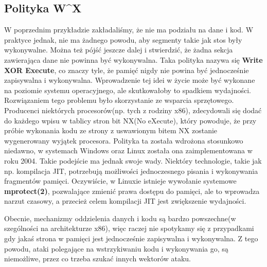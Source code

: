\documentclass[polish]{kbk}
\begin{document}
\subsection{Polityka W\string^X}
W poprzednim przykładzie zakładaliśmy, że nie ma podziału na dane i kod. 
W praktyce jednak, nie ma żadnego powodu, aby segmenty takie jak stos
były wykonywalne. Można też pójść jeszcze dalej i stwierdzić, że żadna 
sekcja zawierająca dane nie powinna być wykonywalna. Taka polityka 
nazywa się \textbf{Write XOR Execute}, co znaczy tyle, że pamięć nigdy 
nie powina być jednocześnie zapisywalna i wykonywalna. Wprowadzenie tej idei 
w życie może być wykonane na poziomie systemu operacyjnego, ale skutkowałoby 
to spadkiem wydajności\cite{bitnx}. Rozwiązaniem tego problemu było skorzystanie 
ze wsparcia sprzętowego. Producenci niektórych procesorów(np. tych z rodziny x86), 
zdecydowali się dodać do każdego wpisu w tablicy stron bit NX(No eXecute), który 
powoduje, że przy próbie wykonania kodu ze strony z uswawionym bitem NX zostanie 
wygenerowany wyjątek procesora. Polityka ta została wdrożona stosunkowo niedawno, 
w systemach Windows oraz Linux została ona zaimplementowana w roku 2004\cite{bitnx}.
Takie podejście ma jednak swoje wady. Niektóry technologie, takie jak np. 
kompilacja JIT, potrzebują możliwości jednoczesnego pisania i wykonywania 
fragmentów pamięci. Oczywiście, w Linuxie istnieje wywołanie systemowe 
\textbf{mprotect(2)}, pozwalające zmienić prawa dostępu do pamięci, ale to 
wprowadza narzut czasowy, a przecież celem kompilacji JIT jest zwiększenie wydajności.
\par
Obecnie, mechanizmy oddzielenia danych i kodu są bardzo powszechne(w szególności
na architekturze x86), więc raczej nie spotykamy się z przypadkami gdy jakaś strona
w pamięci jest jednocześnie zapisywalna i wykonywalna. Z tego powodu, ataki
polegające na wstrzykiwaniu kodu i wykonywania go, są niemożliwe, przez 
co trzeba szukać innych wektorów ataku.
\end{document}
